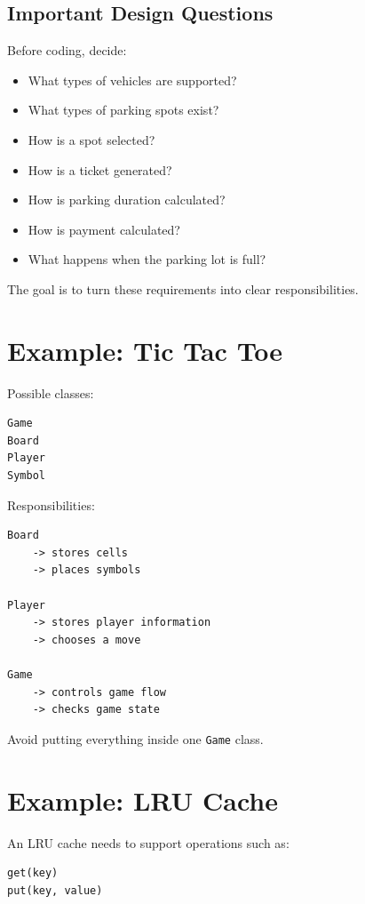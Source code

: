 \documentclass[12pt,a4paper]{article}
\begin{document}
\subsection{Important Design Questions}

Before coding, decide:

\begin{itemize}
\item What types of vehicles are supported?
\item What types of parking spots exist?
\item How is a spot selected?
\item How is a ticket generated?
\item How is parking duration calculated?
\item How is payment calculated?
\item What happens when the parking lot is full?
\end{itemize}

The goal is to turn these requirements into clear responsibilities.

\section{Example: Tic Tac Toe}

Possible classes:

\begin{verbatim}
Game
Board
Player
Symbol
\end{verbatim}

Responsibilities:

\begin{verbatim}
Board
    -> stores cells
    -> places symbols

Player
    -> stores player information
    -> chooses a move

Game
    -> controls game flow
    -> checks game state
\end{verbatim}

Avoid putting everything inside one \texttt{Game} class.

\section{Example: LRU Cache}

An LRU cache needs to support operations such as:

\begin{verbatim}
get(key)
put(key, value)
\end{verbatim}
\end{document}
